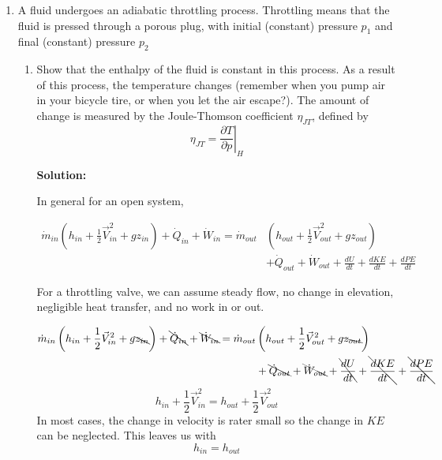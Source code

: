 \documentclass[10pt]{article}
\newenvironment{Solution}
    {\textbf{Solution:}
    
    \vspace{5mm}
    \begin{tcolorbox}
    }
    {
    \end{tcolorbox}
    \vspace{5mm}
    }
\begin{document}

\begin{enumerate}


\item A fluid undergoes an adiabatic throttling process. Throttling means that the fluid is pressed through a porous plug, with initial (constant) pressure $p_{1}$ and final (constant) pressure $p_{2}$

\begin{enumerate}

\item Show that the enthalpy of the fluid is constant in this process. As a result of this process, the temperature changes (remember when you pump air in your bicycle tire, or when you let the air escape?). The amount of change is measured by the Joule-Thomson coefficient $\eta_{J T}$, defined by
$$
\eta_{J T}=\left.\frac{\partial T}{\partial p}\right|_{H}
$$

\begin{Solution}
In general for an open system,

\begin{align}
\dot{m}_{i n}\left(h_{i n}+\frac{1}{2} \vec{V}_{i n}^{2}+g z_{i n}\right)+\dot{Q}_{i n}+\dot{W}_{i n} 
=\dot{m}_{o u t}&\left(h_{o u t}+\frac{1}{2} \vec{V}_{o u t}^{2}+g z_{o u t}\right) \\
&+\dot{Q}_{o u t}+\dot{W}_{o u t}+\frac{d U}{d t}+\frac{d K E}{d t}+\frac{d P E}{d t}
\end{align}

For a throttling valve, we can assume steady flow, no change in elevation, negligible heat transfer, and no work in or out. 

\begin{align}
\dot{m}_{i n}\left(h_{i n}+\frac{1}{2} \vec{V}_{i n}^{2}+g \bcancel{z_{i n}}\right)+\bcancel{\dot{Q}_{i n}}+\bcancel{\dot{W}_{i n}}
=\dot{m}_{o u t}&\left(h_{o u t}+\frac{1}{2} \vec{V}_{o u t}^{2}+g \bcancel{z_{o u t}}\right) \\
&+\bcancel{\dot{Q}_{o u t}}+\bcancel{\dot{W}_{o u t}}+\bcancel{\frac{d U}{d t}}+\bcancel{\frac{d K E}{d t}}+\bcancel{\frac{d P E}{d t}}
\end{align}
\begin{equation}
    h_{i n}+\frac{1}{2} \vec{V}_{i n}^{2} = h_{o u t}+\frac{1}{2} \vec{V}_{o u t}^{2}
\end{equation}
In most cases, the change in velocity is rater small so the change in $KE$ can be neglected. This leaves us with
\begin{equation}
    \boxed{h_{in} = h_{out}}
\end{equation}
\end{Solution}


\end{enumerate}
\end{enumerate}
\end{document}
